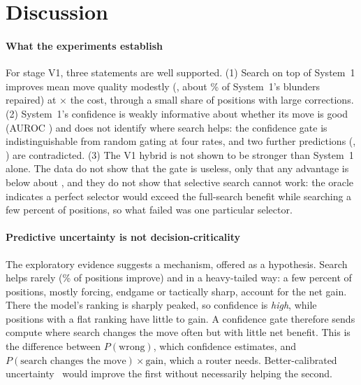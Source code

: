 \section{Discussion}
\label{sec:disc}
\paragraph*{What the experiments establish}
For stage V1, three statements are well supported. (1) Search on top of System~1 improves mean move quality modestly (\dAcplAbs\cp, about \fixedPct\% of System~1's blunders repaired) at \costRatio$\times$ the cost, through a small share of positions with large corrections. (2) System~1's confidence is weakly informative about whether its move is good (AUROC \aucConf) and does not identify where search helps: the confidence gate is indistinguishable from random gating at four rates, and two further predictions (\Hfour{}, \Hfive{}) are contradicted. (3) The V1 hybrid is not shown to be stronger than System~1 alone. The data do not show that the gate is useless, only that any advantage is below about \maxAdvHi\cp, and they do not show that selective search cannot work: the oracle indicates a perfect selector would exceed the full-search benefit while searching a few percent of positions, so what failed was one particular selector.

\paragraph*{Predictive uncertainty is not decision-criticality}
The exploratory evidence suggests a mechanism, offered as a hypothesis. Search helps rarely (\fracGainPos\% of positions improve) and in a heavy-tailed way: a few percent of positions, mostly forcing, endgame or tactically sharp, account for the net gain. There the model's ranking is sharply peaked, so confidence is \emph{high}, while positions with a flat ranking have little to gain. A confidence gate therefore sends compute where search changes the move often but with little net benefit. This is the difference between $P(\text{wrong})$, which confidence estimates, and $P(\text{search changes the move})\times\text{gain}$, which a router needs. Better-calibrated uncertainty~\cite{lakshminarayanan2017,gal2016} would improve the first without necessarily helping the second.

